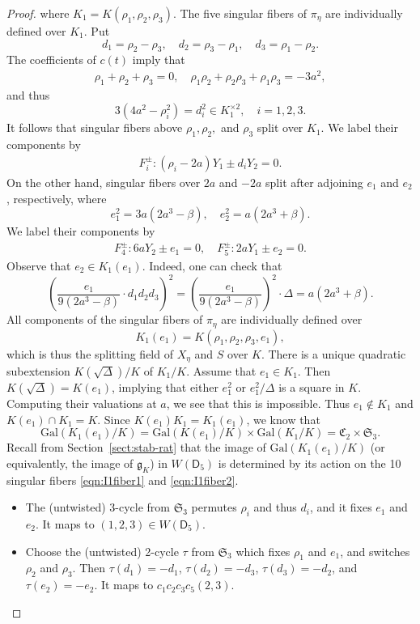 \documentclass[12pt, reqno]{amsart}
\theoremstyle{plain}
\theoremstyle{remark}
\theoremstyle{definition}
\numberwithin{equation}{section}
\def\sD{{\mathsf D}}
\def\fC{{\mathfrak C}}
\def\fS{{\mathfrak S}}
\def\fS{{\mathfrak S}}
\def\Gal{\mathrm{Gal}}
\begin{document}
\begin{proof}
where
$
K_1=K(\rho_1,\rho_2,\rho_3).
$
The five singular fibers of $\pi_\eta$ are individually defined over $K_1$. Put 
$$
d_1=\rho_2-\rho_3,\quad d_2=\rho_3-\rho_1,\quad d_3=\rho_1-\rho_2.
$$
The coefficients of $c(t)$ imply that
\begin{align*}
\rho_1+\rho_2+\rho_3=0,\quad \rho_1\rho_2+\rho_2\rho_3+\rho_1\rho_3=-3a^2,
\end{align*}
and thus
$$
3(4a^2-\rho_i^2)=d_i^2\in K_1^{\times2},\quad i=1,2,3.
$$
It follows that singular fibers above $\rho_1,\rho_2,$ and $\rho_3$ split over $K_1.$ We label their components by
\begin{align}\label{eqn:I1fiber1}
F_i^\pm: (\rho_i-2a)Y_1\pm d_iY_2=0.
\end{align}
On the other hand, singular fibers over 
$
2a$ and $-2a$  split after adjoining $e_1$ and $e_2$, respectively, where 
$$
e_1^2={3a(2a^3-\beta)},\quad e_2^2={a(2a^3+\beta)}.
$$ 
We label their components by
\begin{align}\label{eqn:I1fiber2}
 F_4^\pm:6aY_2\pm e_1=0,\quad F_5^\pm :2aY_1\pm e_2=0.
\end{align}
Observe that $e_2\in K_1(e_1)$. Indeed, one can check that
$$
\left(\frac{e_1}{9(2a^3-\beta)}\cdot d_1d_2d_3\right)^2=\left(\frac{e_1}{9(2a^3-\beta)}\right)^2\cdot\Delta=a(2a^3+\beta).
$$
 All components of the singular fibers of $\pi_\eta$ are individually defined over 
$$
K_1(e_1)=K(\rho_1,\rho_2,\rho_3,e_1),
$$
which is thus the splitting field of $X_{\eta}$ and $S$ over $K$. There is a unique quadratic subextension  $K(\sqrt{\Delta})/K$ of $K_1/K$. Assume that $e_1\in K_1$.  Then $K(\sqrt{\Delta})=K(e_1)$, implying that either  $e_1^2$ or $e_1^2/\Delta$ is a square in $K$. Computing their valuations at $a$, we see that this is impossible. Thus $e_1\not\in K_1$ and
$K(e_1)\cap K_1=K$. Since $K(e_1)K_1=K_1(e_1)$, we know that
$$
\Gal(K_1(e_1)/K)=\Gal(K(e_1)/K)\times \Gal(K_1/K)=\fC_2\times\fS_3.
$$
 Recall from Section~\ref{sect:stab-rat} that  the image of $\Gal(K_1(e_1)/K)$ (or equivalently, the image of $\mathfrak g_K$) in $W(\sD_5)$
is determined by its action on the 10 singular fibers \eqref{eqn:I1fiber1} and \eqref{eqn:I1fiber2}. \begin{itemize}
    \item The (untwisted) 3-cycle from $\fS_3$ permutes $\rho_i$ and thus $d_i$, and it fixes $e_1$ and $e_2$.  It maps to $(1,2,3)\in W(\sD_5)$. 
    \item Choose the (untwisted) 2-cycle $\tau$ from $\fS_3$ which fixes $\rho_1$ and $e_1$, and switches $\rho_2$ and $\rho_3$. Then $\tau(d_1)=-d_1$, $\tau(d_2)=-d_3$, $\tau(d_3)=-d_2$, and  $\tau(e_2)=-e_2$. It maps to $c_1c_2c_3c_5(2,3)$.

\end{itemize}
\end{proof}
\end{document}

